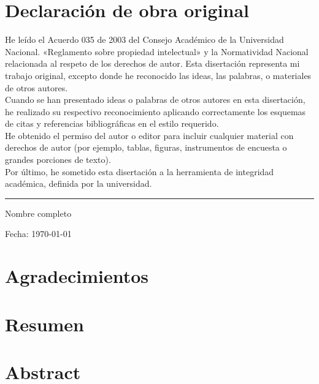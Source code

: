 \chapter*{Declaración de obra original}


He leído el Acuerdo 035 de 2003 del Consejo Académico de la Universidad Nacional. «Reglamento sobre propiedad intelectual»  y la Normatividad Nacional relacionada al respeto de los derechos de autor. Esta disertación representa mi trabajo original, excepto donde he reconocido las ideas, las palabras, o materiales de otros autores.\\

Cuando se han presentado ideas o palabras de otros autores en esta disertación, he realizado su respectivo reconocimiento aplicando correctamente los esquemas de citas y referencias bibliográficas en el estilo requerido.\\

He obtenido el permiso del autor o editor para incluir cualquier material con derechos de autor (por ejemplo, tablas, figuras, instrumentos de encuesta o grandes porciones de texto).\\

Por último, he sometido esta disertación a la herramienta de integridad académica, definida por la universidad.
\vfill
\rule{0.4\textwidth}{1pt}

Nombre completo

\vspace{0.5cm}
Fecha: \today
\vspace{1cm}

\chapter*{Agradecimientos}


\chapter*{Resumen}



\chapter*{Abstract}
